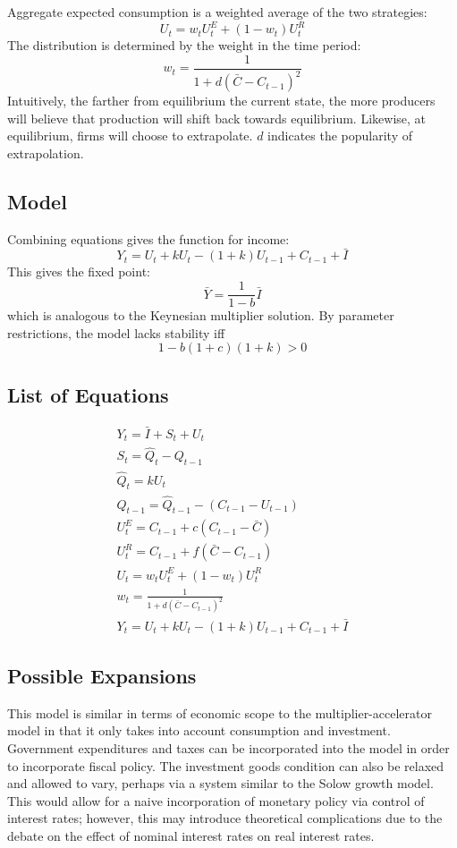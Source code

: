 \documentclass[]{article}
\begin{document}
Aggregate expected consumption is a weighted average of the two strategies:
\begin{equation*}
	U_t=w_tU_t^E+(1-w_t)U_t^R
\end{equation*}
The distribution is determined by the weight in the time period:
\begin{equation*}
	w_t=\frac{1}{1+d(\bar C-C_{t-1})^2}
\end{equation*}
Intuitively, the farther from equilibrium the current state, the more producers will believe that production will shift back towards equilibrium. Likewise, at equilibrium, firms will choose to extrapolate. $d$ indicates the popularity of extrapolation. 
\subsection*{Model}
Combining equations gives the function for income:
\begin{equation*}
	Y_t=U_t+kU_t-(1+k)U_{t-1}+C_{t-1}+\bar I
\end{equation*}
This gives the fixed point:
\begin{equation*}
	\bar Y=\frac{1}{1-b}\bar I
\end{equation*}
which is analogous to the Keynesian multiplier solution. By parameter restrictions, the model lacks stability iff
\begin{equation*}
	1-b(1+c)(1+k)>0
\end{equation*}
\subsection*{List of Equations}
	\begin{gather*}
		Y_t=\bar I+S_t+U_t\\
		S_t=\hat Q_t-Q_{t-1}\\
		\hat Q_t=k U_t\\
		Q_{t-1}=\hat Q_{t-1}-(C_{t-1}-U_{t-1})\\
		U_t^E=C_{t-1}+c(C_{t-1}-\bar C)\\
		U_t^R=C_{t-1}+f(\bar C-C_{t-1})\\
		U_t=w_tU_t^E+(1-w_t)U_t^R\\
		w_t=\frac{1}{1+d(\bar C-C_{t-1})^2}\\
		Y_t=U_t+kU_t-(1+k)U_{t-1}+C_{t-1}+\bar I
	\end{gather*}
\subsection*{Possible Expansions}
This model is similar in terms of economic scope to the multiplier-accelerator model in that it only takes into account consumption and investment. Government expenditures and taxes can be incorporated into the model in order to incorporate fiscal policy. The investment goods condition can also be relaxed and allowed to vary, perhaps via a system similar to the Solow growth model. This would allow for a naive incorporation of monetary policy via control of interest rates; however, this may introduce theoretical complications due to the debate on the effect of nominal interest rates on real interest rates.
\end{document}
